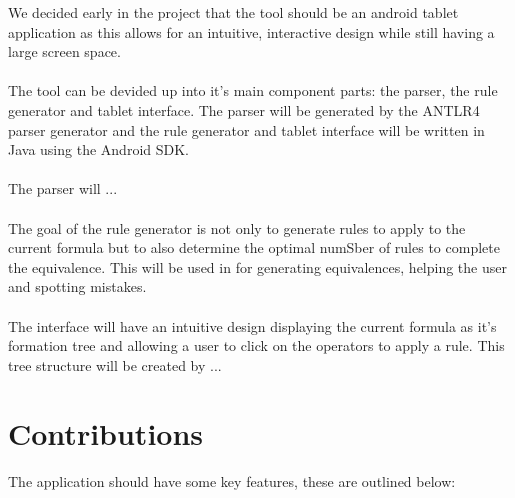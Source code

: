 \documentclass{report}
\begin{document}
We decided early in the project that the tool should be an android tablet application as this allows for an intuitive, interactive design while still having a large screen space.
\\\\
The tool can be devided up into it's main component parts: the parser, the rule generator and tablet interface. The parser will be generated by the ANTLR4 parser generator and the rule generator and tablet interface will be written in Java using the Android SDK.
\\\\
The parser will ...
\\\\
The goal of the rule generator is not only to generate rules to apply to the current formula but to also determine the optimal numSber of rules to complete the equivalence. This will be used in for generating equivalences, helping the user and spotting mistakes.
\\\\
The interface will have an intuitive design displaying the current formula as it's formation tree and allowing a user to click on the operators to apply a rule. This tree structure will be created by ...

\section{Contributions}

The application should have some key features, these are outlined below:
\end{document}
